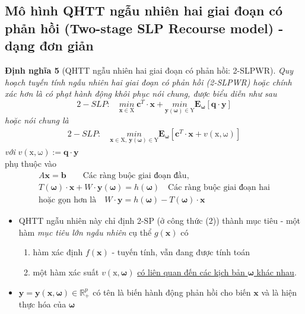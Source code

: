 \documentclass[a4paper]{article}
\begin{document}
	\subsection{Mô hình QHTT ngẫu nhiên hai giai đoạn có phản hồi (Two-stage SLP Recourse model) - dạng đơn giản}
	\textbf{Định nghĩa 5} (QHTT ngẫu nhiên hai giai đoạn có phản hồi: 2-SLPWR).
    \textit{Quy hoạch tuyến tính ngẫu nhiên hai giai đoạn có phản hồi (2-SLPWR) hoặc chính xác hơn là có 
        phạt hành động khôi phục nói chung, được biểu diễn như sau}
    \begin{displaymath}
        2-SLP: \quad \underset{\boldsymbol{x \in \mathrm{X}}}{min} \; \boldsymbol{c}^T \cdot \boldsymbol{x} +
        \underset{\boldsymbol{y(\omega) \in \mathrm{Y}}}{min} \mathbf{E_{\omega}}[\boldsymbol{q \cdot y}]
    \end{displaymath}
    \textit{hoặc nói chung là}
    \begin{gather}
        2-SLP: \quad \underset{\boldsymbol{x \in \mathrm{X}, \: y(\omega) \in \mathrm{Y}}}{min}
        \mathbf{E_{\omega}}[\boldsymbol{c}^T \cdot \boldsymbol{x} + v(\boldsymbol{\mathrm{x, \omega}})]
    \end{gather}
    \textit{với} $v(\boldsymbol{\mathrm{x, \omega}}) \mathrel{:=} \boldsymbol{q \cdot y}$\\
    phụ thuộc vào
    \begin{gather*}
        A\boldsymbol{x}=\boldsymbol{b} \quad \quad \text{Các ràng buộc giai đoạn đầu,}\\
        T(\boldsymbol{\omega}) \cdot \boldsymbol{x} + W \cdot \boldsymbol{y(\omega)} = h(\boldsymbol{\omega}) \quad \text{Các ràng buộc giai đoạn hai}\\
        \text{hoặc gọn hơn là} \quad W \cdot \boldsymbol{y} = h(\boldsymbol{\omega}) - T(\boldsymbol{\omega}) \cdot \boldsymbol{x}
    \end{gather*}
    \begin{itemize}
        \item QHTT ngẫu nhiên này chỉ định 2-SP (ở công thức (2)) thành mục tiêu - một hàm 
        \textit{mục tiêu lớn ngẫu nhiên} cụ thể $g(\boldsymbol{x})$ có
        \begin{enumerate}
            \item hàm xác định $f(\boldsymbol{x})$ - tuyến tính, vẫn đang được tính toán
            \item một hàm xác suất $v(\boldsymbol{\mathrm{x}, \omega})$ \underline{có liên quan đến các kịch bản $\boldsymbol{\omega}$ khác nhau}.
        \end{enumerate}
        \item $\boldsymbol{y=y(x, \omega)} \in \mathbb{R}_+^p$ có tên là biến hành động phản hồi cho biến $\boldsymbol{x}$
            và là hiện thực hóa của $\boldsymbol{\omega}$
    \end{itemize}
\end{document}

